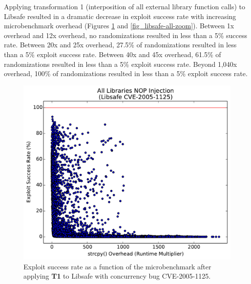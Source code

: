 Applying transformation 1 (interposition of all external library function calls) to Libsafe resulted in a dramatic decrease in exploit success rate with increasing microbenchmark overhead (Figures \ref{fig_libsafe-all} and \ref{fig_libsafe-all-zoom}).
Between 1x overhead and 12x overhead, no randomizations resulted in less than a 5\% success rate.
Between 20x and 25x overhead, 27.5\% of randomizations resulted in less than a 5\% exploit success rate.
Between 40x and 45x overhead, 61.5\% of randomizations resulted in less than a 5\% exploit success rate.
Beyond 1,040x overhead, 100\% of randomizations resulted in less than a 5\% exploit success rate.
\begin{figure}
	\centering
	\includegraphics[width=\columnwidth]{figures/libsafe-all}
	\caption{Exploit success rate as a function of the microbenchmark after applying \textbf{T1} to Libsafe with concurrency bug CVE-2005-1125.}
	\label{fig_libsafe-all}
\end{figure}
